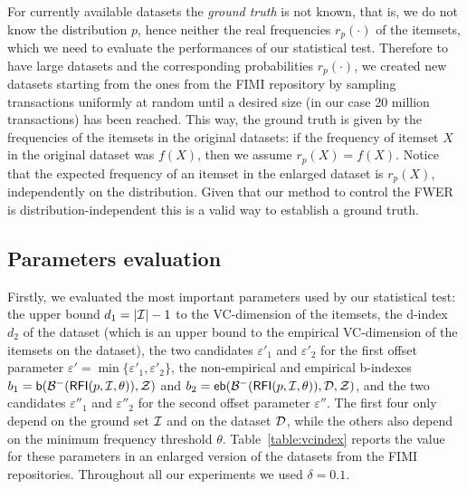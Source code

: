 For currently available datasets the \emph{ground truth} is not known, that is,
we do not know the distribution $p$, hence neither the real frequencies
$r_p(\cdot)$ of the itemsets, which we need to evaluate the performances of our
statistical test.
Therefore to have large datasets and the corresponding 
probabilities $r_p(\cdot)$, we created new datasets starting from the ones from
the FIMI repository by sampling transactions uniformly at random until a desired
size (in our case 20 million transactions) has been reached. This way, 
the ground truth is given by the frequencies of the itemsets in the original datasets:
if the frequency of itemset $X$ in the original dataset was $f(X)$,
then we assume $r_p(X)=f(X)$.
Notice that the expected frequency 
of an itemset in the enlarged dataset is $r_p(X)$, independently on the
distribution. Given that our method to control the FWER is
distribution-independent this is a valid way to establish a ground truth.

\subsection{Parameters evaluation}\label{sec:vcindexeval}
Firstly, we evaluated the most important parameters used by our statistical
test: the upper bound $d_1=|{\cal I}|-1$ to the VC-dimension of the itemsets, the
d-index $d_2$ of the dataset (which is an upper bound to the empirical
VC-dimension of the itemsets on the dataset), the two candidates $\varepsilon'_1$ and
$\varepsilon'_2$ for the first offset parameter
$\varepsilon'=\min\{\varepsilon'_1,\varepsilon'_2\}$, the non-empirical and
empirical b-indexes
$b_1=\mathsf{b}(\mathcal{B}^-(\mathsf{RFI}(p,{\cal I},\theta)),\mathcal{Z})$ and
$b_2=\mathsf{eb}(\mathcal{B}^-(\mathsf{RFI}(p,{\cal I},\theta)),{\cal D},\mathcal{Z})$, and the
two
candidates $\varepsilon''_1$ and $\varepsilon''_2$ for the second offset
parameter $\varepsilon''$. The first four only depend on the ground set ${\cal I}$
and on the dataset ${\cal D}$, while the others also depend on the minimum frequency
threshold
$\theta$. Table~\ref{table:vcindex} reports the value for these parameters in
an enlarged version of the datasets from the FIMI repositories. 
Throughout all our experiments we used $\delta=0.1$.

